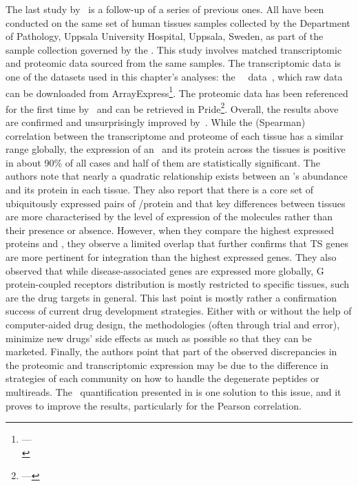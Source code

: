 The last study by~\citet{Wang2019-ut} is a follow-up of a series of previous ones.
All have been conducted on the same set of human tissues samples
collected by the Department of Pathology,
Uppsala University Hospital, Uppsala, Sweden,
as part of the sample collection governed by
the .
This study involves matched transcriptomic and proteomic data sourced
from the same samples.
The transcriptomic data is one of the datasets used in this chapter's analyses:
the \uhlen\ \etal\ data~,
which raw data can be downloaded from \gls{ArrayExpress}\footnote{%
---\\ }.
The proteomic data has been referenced for the first time by~\citet{Wang2019-ut}
and can be retrieved in \gls{Pride}\footnote{%
 ---
}.
Overall, the results above are confirmed and unsurprisingly improved by~\citet{Wang2019-ut}.
While the (Spearman) correlation
between the transcriptome and proteome of each tissue
has a similar range globally,
the expression of an \mRNA\ and its protein across the tissues is positive in
about 90\% of all cases and half of them are statistically significant.
The authors note that nearly a quadratic relationship exists
between an \mRNA{}'s abundance and its protein in each tissue.
They also report that there is a core set of ubiquitously expressed pairs of
\mRNA/protein
and that key differences between tissues are more characterised
by the level of expression of the molecules rather than their presence or absence.
However, when they compare the highest expressed proteins and \mRNAs,
they observe a limited overlap that
further confirms that \gls{TS} genes are more pertinent for integration
than the highest expressed genes.
They also observed that while disease-associated genes are expressed more globally,
G protein-coupled receptors distribution is mostly restricted to specific tissues,
such are the drug targets in general.
This last point is mostly rather a confirmation success
of current drug development strategies.
Either with or without the help of computer-aided drug design,
the methodologies
(often through trial and error),
minimize new drugs' side effects as much as possible
so that they can be marketed.
Finally, the authors point that part of the observed discrepancies
in the proteomic and transcriptomic expression
may be due to the difference in strategies of each community
on how to handle the degenerate peptides or multireads.
The \PPKM\ quantification presented in 
is one solution to this issue,
and it proves to improve the results,
particularly for the Pearson correlation.

